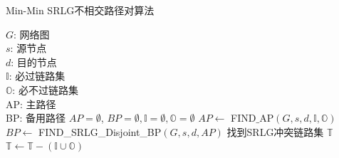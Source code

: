 \begin{algorithm}[htb]
\caption{Min-Min SRLG不相交路径对算法}
\begin{algorithmic}[1]
\label{alg:min-min}
\REQUIRE
$G$: 网络图\\
$s$: 源节点\\
$d$: 目的节点 \\
$\mathbb{I}$:   必过链路集\\
$\mathbb{O}$: 必不过链路集\\
\ENSURE
AP: 主路径\\
BP: 备用路径
\STATE $AP=\emptyset$, $BP=\emptyset, \mathbb{I}=\emptyset, \mathbb{O}=\emptyset$
\STATE $AP\leftarrow$ FIND$\_$AP$(G,s,d,\mathbb{I},\mathbb{O})$\label{alg:findap}
    \RETURN $BP\leftarrow$ FIND\_SRLG\_Disjoint\_BP$(G,s,d,AP)$\label{alg:findsrlgdisjointbp}
        \label{alg:returnpathpair}
    \ELSE
        \STATE 找到SRLG冲突链路集 $\mathbb{T}$\label{alg:findsrlgconflictinglinkset}
        \STATE $\mathbb{T}\leftarrow \mathbb{T}-(\mathbb{I}\cup\mathbb{O})$
        \label{alg:dividedandconquer}
        \label{alg:findfeasible}
        \ENDIF

    \ENDIF
\ENDIF
\end{algorithmic}
\end{algorithm}

